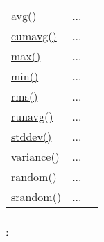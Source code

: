 \textcolor{blue}{}\begin{tabular}{>{\raggedleft}p{3cm}>{\centering}p{0.5cm}l}
\textcolor{blue}{\hyperlink{avg}{avg()}}&
...&
 \begin{NoHyper} \nameref{par:Average} \end{NoHyper}\tabularnewline
\textcolor{blue}{\hyperlink{cumavg}{cumavg()}}&
...&
 \begin{NoHyper} \nameref{par:Cumulative-average} \end{NoHyper}\tabularnewline
\textcolor{blue}{\hyperlink{max}{max()}}&
...&
 \begin{NoHyper} \nameref{par:Maximum} \end{NoHyper}\tabularnewline
\textcolor{blue}{\hyperlink{min}{min()}}&
...&
 \begin{NoHyper} \nameref{par:Minimum} \end{NoHyper}\tabularnewline
\textcolor{blue}{\hyperlink{rms}{rms()}}&
...&
 \begin{NoHyper} \nameref{par:rms} \end{NoHyper}\tabularnewline
\textcolor{blue}{\hyperlink{runavg}{runavg()}}&
...&
 \begin{NoHyper} \nameref{par:Running-average} \end{NoHyper}\tabularnewline
\textcolor{blue}{\hyperlink{stddev}{stddev()}}&
...&
 \begin{NoHyper} \nameref{par:Standard-deviation} \end{NoHyper}\tabularnewline
\textcolor{blue}{\hyperlink{variance}{variance()}}&
...&
 \begin{NoHyper} \nameref{par:Variance} \end{NoHyper}\tabularnewline
\textcolor{blue}{\hyperlink{random}{random()}}&
...&
 \begin{NoHyper} \nameref{par:random} \end{NoHyper}\tabularnewline
\textcolor{blue}{\hyperlink{srandom}{srandom()}}&
...&
 \begin{NoHyper} \nameref{par:srandom} \end{NoHyper}\tabularnewline
\end{tabular}


\subsubsection*{: }

